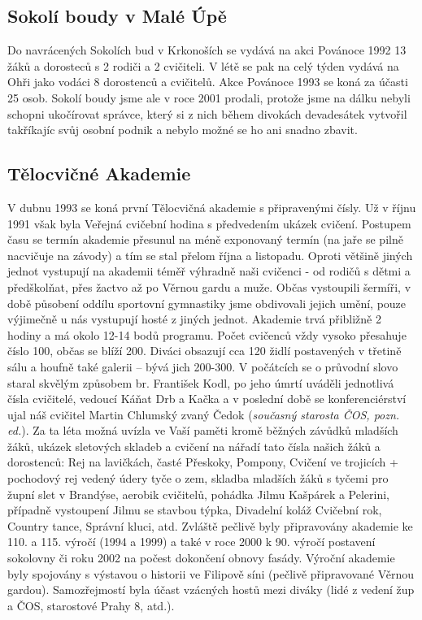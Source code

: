 \subsection{Sokolí boudy v Malé
Úpě}\label{sokoluxed-boudy-v-maluxe9-uxfapux11b}

Do navrácených Sokolích bud v Krkonoších se vydává na akci Povánoce 1992
13 žáků a dorosteců s 2 rodiči a 2 cvičiteli. V létě se pak na celý
týden vydává na Ohři jako vodáci 8 dorostenců a cvičitelů. Akce Povánoce
1993 se koná za účasti 25 osob. Sokolí boudy jsme ale v roce 2001
prodali, protože jsme na dálku nebyli schopni ukočírovat správce, který
si z nich během divokách devadesátek vytvořil takříkajíc svůj osobní
podnik a nebylo možné se ho ani snadno zbavit.

\subsection{Tělocvičné Akademie}\label{tux11blocviux10dnuxe9-akademie}

V dubnu 1993 se koná první Tělocvičná akademie s připravenými čísly. Už
v říjnu 1991 však byla Veřejná cvičební hodina s předvedením ukázek
cvičení. Postupem času se termín akademie přesunul na méně exponovaný
termín (na jaře se pilně nacvičuje na závody) a tím se stal přelom října
a listopadu. Oproti většině jiných jednot vystupují na akademii téměř
výhradně naši cvičenci - od rodičů s dětmi a předškolňat, přes žactvo až
po Věrnou gardu a muže. Občas vystoupili šermíři, v době působení oddílu
sportovní gymnastiky jsme obdivovali jejich umění, pouze výjimečně u nás
vystupují hosté z jiných jednot. Akademie trvá přibližně 2 hodiny a má
okolo 12-14 bodů programu. Počet cvičenců vždy vysoko přesahuje číslo
100, občas se blíží 200. Diváci obsazují cca 120 židlí postavených v
třetině sálu a houfně také galerii -- bývá jich 200-300. V počátcích se
o průvodní slovo staral skvělým způsobem br. František Kodl, po jeho
úmrtí uváděli jednotlivá čísla cvičitelé, vedoucí Káňat Drb a Kačka a v
poslední době se konferenciérství ujal náš cvičitel Martin Chlumský
zvaný Čedok (\emph{současný starosta ČOS, pozn. ed.}). Za ta léta možná
uvízla ve Vaší paměti kromě běžných závůdků mladších žáků, ukázek
sletových skladeb a cvičení na nářadí tato čísla našich žáků a
dorostenců: Rej na lavičkách, časté Přeskoky, Pompony, Cvičení ve
trojicích + pochodový rej vedený údery tyče o zem, skladba mladších žáků
s tyčemi pro župní slet v Brandýse, aerobik cvičitelů, pohádka Jilmu
Kašpárek a Pelerini, případně vystoupení Jilmu se stavbou týpka,
Divadelní koláž Cvičební rok, Country tance, Správní kluci, atd. Zvláště
pečlivě byly připravovány akademie ke 110. a 115. výročí (1994 a 1999) a
také v roce 2000 k 90. výročí postavení sokolovny či roku 2002 na počest
dokončení obnovy fasády. Výroční akademie byly spojovány s výstavou o
historii ve Filipově síni (pečlivě připravované Věrnou gardou).
Samozřejmostí byla účast vzácných hostů mezi diváky (lidé z vedení žup a
ČOS, starostové Prahy 8, atd.).

